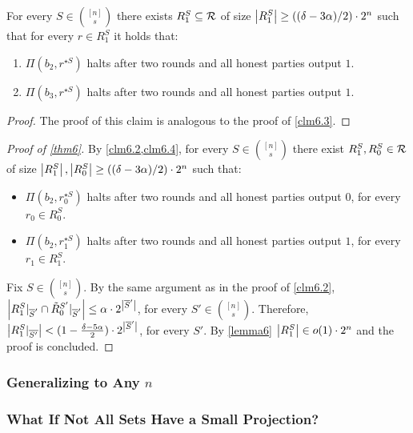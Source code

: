 \begin{claim}\label{clm6.4}
For every $S \in \binom{[n]}{s}$ there exists $R^S_{1} \subseteq \mathcal{R}$ of size ${\left\lvert R^S_{1} \right\rvert \geq ((\delta-3\alpha)/2) \cdot 2^{n}}$ such that for every $r \in R^S_{1}$ it holds that:
\begin{enumerate}
	\item $\Pi(b_2,r^{\star S})$ halts after two rounds and all honest parties output $1$.
	\item $\Pi(b_3,r^{\star S})$ halts after two rounds and all honest parties output $1$.
\end{enumerate}
\end{claim}

\begin{proof}
	The proof of this claim is analogous to the proof of \cref{clm6.3}.
\end{proof}


\begin{proof}[Proof of \cref{thm6}]
	By \cref{clm6.2,clm6.4}, for every $S \in \binom{[n]}{s}$ there exist $R^S_1,R^S_0 \in \mathcal{R}$ of size $\left|R^S_1\right|,\left|R^S_0\right| \geq ((\delta-3\alpha)/2) \cdot 2^{n}$ such that:
	\begin{itemize}
		\item $\Pi(b_2,r^{\star S}_0)$ halts after two rounds and all honest parties output $0$, for every $r_0 \in R^S_0$.
		\item $\Pi(b_2,r^{\star S}_1)$ halts after two rounds and all honest parties output $1$, for every $r_1 \in R^S_1$.
	\end{itemize}
	Fix $S \in \binom{[n]}{s}$. By the same argument as in the proof of \cref{clm6.2}, $\left|{R^S_1|_{\overline{S}'} \cap \tilde{R}^{S'}_0|_{\overline{S}'}}\right| \leq \alpha \cdot 2^{\left|\overline{S}'\right|}$, for every $S' \in \binom{[n]}{s}$. Therefore, $\left|R^S_1|_{\overline{S'}}\right| < (1-\frac{\delta - 5\alpha}{2}) \cdot 2^{\left|\overline{S}'\right|}$, for every $S'$. By \cref{lemma6} $\left|R^S_1\right| \in o(1) \cdot 2^{n}$ and the proof is concluded.

\end{proof}

\subsubsection{Generalizing to Any $n$}

\subsubsection{What If Not All Sets Have a Small Projection?}

